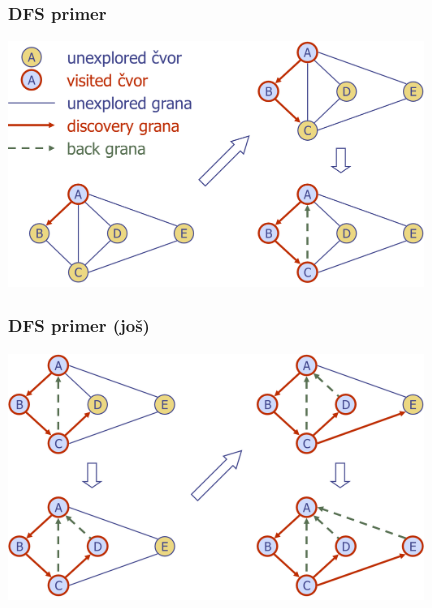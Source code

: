 \documentclass[compress]{beamer}
\begin{document}
\begin{frame}[fragile]
  \frametitle{DFS primer}
  \begin{center}
    \includegraphics[width=11cm]{asp-14-pic18.png}
  \end{center}
\end{frame}

\begin{frame}[fragile]
  \frametitle{DFS primer (još)}
  \begin{center}
    \includegraphics[width=11cm]{asp-14-pic19.png}
  \end{center}
\end{frame}
\end{document}
